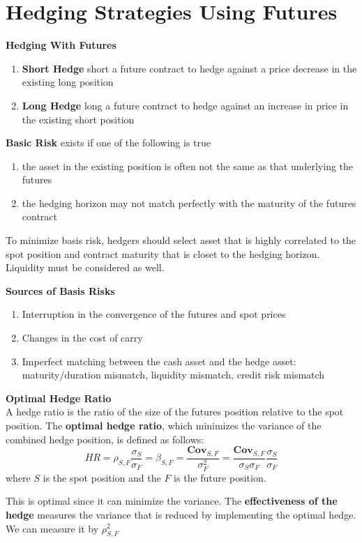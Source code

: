 \documentclass[11pt,fleqn]{book} %
\numberwithin{equation}{section} %
\numberwithin{figure}{section} %
\numberwithin{table}{section} %
\begin{document}
\chapter{Hedging Strategies Using Futures}
\begin{definition}\textbf{Hedging With Futures}
\begin{enumerate}
    \item \textbf{Short Hedge} short a future contract to hedge against a price decrease in the existing long position
    \item \textbf{Long Hedge} long a future contract to hedge against an increase in price in the existing short position
\end{enumerate}
\end{definition}
\begin{definition}\textbf{Basic Risk} exists if one of the following is true
\begin{enumerate}
    \item the asset in the existing position is often not the same as that underlying the futures
    \item the hedging horizon may not match perfectly with the maturity of the futures contract
\end{enumerate}
\end{definition}
\begin{remark}
To minimize basis risk, hedgers should select asset that is highly correlated to the spot position and contract maturity that is closet to the hedging horizon. Liquidity must be considered as well.
\end{remark}
\begin{definition}\textbf{Sources of Basis Risks}
\begin{enumerate}
    \item Interruption in the convergence of the futures and spot prices
    \item Changes in the cost of carry
    \item Imperfect matching between the cash asset and the hedge asset: maturity/duration mismatch, liquidity mismatch, credit risk mismatch
\end{enumerate}
\end{definition}
\begin{theorem}\textbf{Optimal Hedge Ratio}\\
A hedge ratio is the ratio of the size of the futures position relative to the spot position. The \textbf{optimal hedge ratio}, which minimizes the variance of the combined hedge position, is defined as follows:
$$
HR=\rho_{S,F}\frac{\sigma_S}{\sigma_F}=\beta_{S,F}=\frac{\textbf{Cov}_{S,F}}{\sigma_F^2}=\frac{\textbf{Cov}_{S,F}}{\sigma_S\sigma_F}\frac{\sigma_S}{\sigma_F}
$$
where $S$ is the spot position and the $F$ is the future position.
\end{theorem}
\begin{remark}
This is optimal since it can minimize the variance. The \textbf{effectiveness of the hedge} measures the variance that is reduced by implementing the optimal hedge. We can measure it by $\rho_{S,F}^2$
\end{remark}
\end{document}
